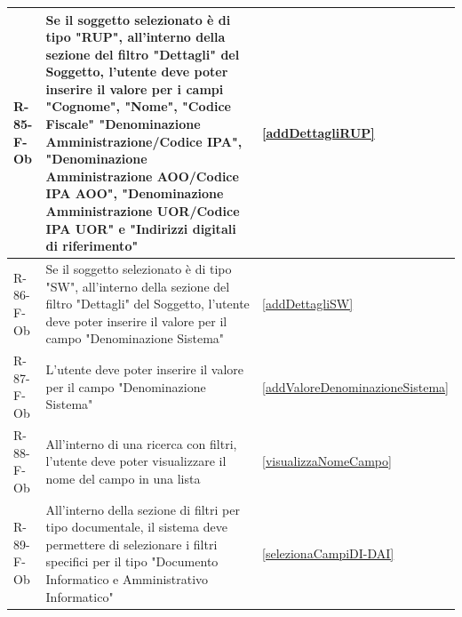 \begin{longtable}{|p{2.5cm}|p{9.5cm}|p{2.5cm}|}
\hline
R-85-F-Ob & Se il soggetto selezionato è di tipo "RUP", all'interno della sezione del filtro "Dettagli" del Soggetto, l'utente deve poter inserire il valore per i campi "Cognome", "Nome", "Codice Fiscale" "Denominazione Amministrazione/Codice IPA", "Denominazione Amministrazione AOO/Codice IPA AOO", "Denominazione Amministrazione UOR/Codice IPA UOR" e "Indirizzi digitali di riferimento" & \ref{addDettagliRUP} \\
\hline
R-86-F-Ob & Se il soggetto selezionato è di tipo "SW", all'interno della sezione del filtro "Dettagli" del Soggetto, l'utente deve poter inserire il valore per il campo "Denominazione Sistema" & \ref{addDettagliSW} \\
\hline
R-87-F-Ob & L'utente deve poter inserire il valore per il campo "Denominazione Sistema" & \ref{addValoreDenominazioneSistema} \\
\hline
R-88-F-Ob & All'interno di una ricerca con filtri, l'utente deve poter visualizzare il nome del campo in una lista & \ref{visualizzaNomeCampo} \\
\hline
R-89-F-Ob & All'interno della sezione di filtri per tipo documentale, il sistema deve permettere di selezionare i filtri specifici per il tipo "Documento Informatico e Amministrativo Informatico" & \ref{selezionaCampiDI-DAI} \\


\end{longtable}
